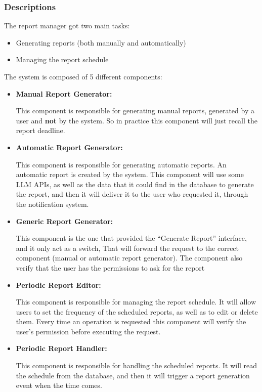 \documentclass{article}
\begin{document}
\subsubsection{Descriptions}
The report manager got  two main tasks:
\begin{itemize}
    \item Generating reports (both manually and automatically) 
    \item Managing the report schedule 
\end{itemize}

The system is composed of 5 different components:

\begin{itemize}
    \item \textbf{Manual Report Generator: }

    This component is responsible for generating manual reports, generated by a user and \textbf{not} by the system.
    So in practice this component will just recall the report deadline.
    \item \textbf{Automatic Report Generator: }

    This component is responsible for generating automatic reports. An automatic report is created by the system. This component will use some LLM APIs, as well as the data that it could find in the database to generate the report, and then it will deliver it
    to the user who requested it, through the notification system.

    \item \textbf{Generic Report Generator: }
    
    This component is the one that provided the ``Generate Report'' interface, and it only act as a switch, That 
    will forward the request to the correct component (manual or automatic report generator).
    The component also verify that the user has the permissions to ask for the report

    \item \textbf{Periodic Report Editor: }

    This component is responsible for managing the report schedule.
    It will allow users to set the frequency of the scheduled reports, as well as to edit or delete them.
    Every time an operation is requested this component will verify the user's permission before executing the request.

    \item \textbf{Periodic Report Handler: }
    
    This component is responsible for handling the scheduled reports.
    It will read the schedule from the database, and then it will trigger a report generation event when the time comes.

\end{itemize}
\end{document}
